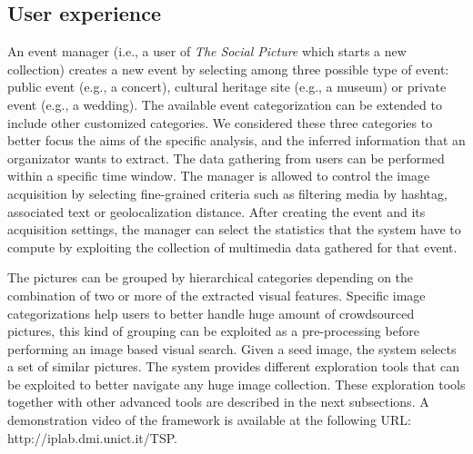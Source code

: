 \subsection{User experience}
An event manager (i.e., a user of \textit{The Social Picture} which starts a new collection) creates a new event by selecting among three possible type of event: public event (e.g., a concert), cultural heritage site (e.g., a museum) or private event (e.g., a wedding). The available event categorization can be extended to include other customized categories. We considered these three categories to better focus the aims of the specific analysis, and the inferred information that an organizator wants to extract.
The data gathering from users can be performed within a specific time window. The manager is allowed to control the image acquisition by selecting fine-grained criteria such as filtering media by hashtag, associated text or geolocalization distance.
After creating the event and its acquisition settings, the manager can select the statistics that the system have to compute by exploiting the collection of multimedia data gathered for that event.

The pictures can be grouped by hierarchical categories depending on the combination of two or more of the extracted visual features. %
Specific image categorizations help users to better handle huge amount of crowdsourced pictures, this kind of grouping can be exploited as a pre-processing before performing an image based visual search. Given a seed image, the system selects a set of similar pictures.
The system provides different exploration tools  %
that can be exploited to better navigate any huge image collection. These exploration tools together with other advanced tools are described in the next subsections.
A demonstration video of the framework is available at the following URL:
http://iplab.dmi.unict.it/TSP.


